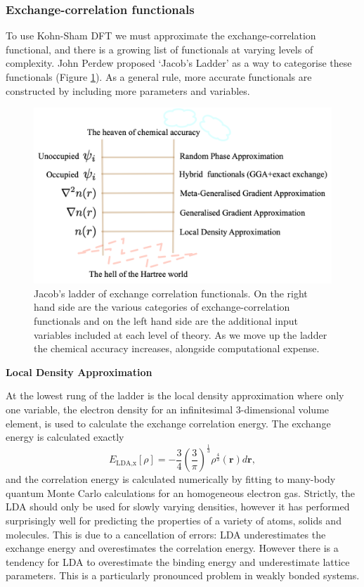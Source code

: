 \subsubsection{Exchange-correlation functionals}
To use Kohn-Sham DFT we must approximate the exchange-correlation functional, and there is a growing list of functionals at varying levels of complexity. John Perdew proposed `Jacob's Ladder' as a way to categorise these functionals (Figure \ref{jladder}). As a general rule, more accurate functionals are constructed by including more parameters and variables.

\begin{figure}[h]
\centering
  \includegraphics[width=0.8\columnwidth]{figures/ch3/jladder.png}
  \caption[Jacob's ladder of exchange-correlation functionals]{Jacob's ladder of exchange correlation functionals. On the right hand side are the various categories of exchange-correlation functionals and on the left hand side are the additional input variables included at each level of theory. As we move up the ladder the chemical accuracy increases, alongside computational expense.}
  \label{jladder}
\end{figure}


\textbf{Local Density Approximation} 

At the lowest rung of the ladder is the local density approximation where only one variable, the electron density for an infinitesimal 3-dimensional volume element, is used to calculate the exchange correlation energy. The exchange energy is calculated exactly
\begin{equation}
E_{\textrm{LDA,x}}\left[\rho\right] = {-\frac{3}{4}\left(\frac{3}{\pi}\right)^{\frac{1}{3}}\rho^{\frac{4}{3}}\left(\textbf{r}\right)d\textbf{r}},
\end{equation}
and the correlation energy is calculated numerically by fitting to many-body quantum Monte Carlo calculations for an homogeneous electron gas.\autocite{Ceperley1980} %
Strictly, the LDA should only be used for slowly varying densities, however it has performed surprisingly well for predicting the properties of a variety of atoms, solids and molecules. This is due to a cancellation of errors: LDA underestimates the exchange energy and overestimates the correlation energy.\autocite{Burke2007} However there is a tendency for LDA to overestimate the binding energy and underestimate lattice parameters. This is a particularly pronounced problem in weakly bonded systems.


